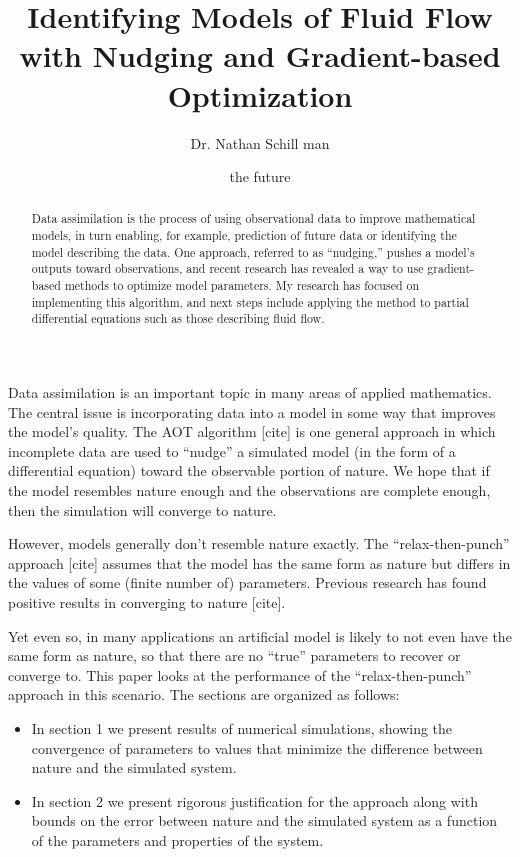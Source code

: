 \documentclass[12pt]{article}
\title{Identifying Models of Fluid Flow with Nudging and Gradient-based Optimization}
\author{Dr. Nathan Schill man}
\date{the future}
\begin{document}
\maketitle

\begin{abstract}
    Data assimilation is the process of using observational data to improve mathematical models, in turn enabling, for example, prediction of future data or identifying the model describing the data.
    One approach, referred to as ``nudging,'' pushes a model's outputs toward observations, and recent research has revealed a way to use gradient-based methods to optimize model parameters.
    My research has focused on implementing this algorithm, and next steps include applying the method to partial differential equations such as those describing fluid flow.
\end{abstract}

Data assimilation is an important topic in many areas of applied mathematics.
The central issue is incorporating data into a model in some way that improves the model's quality.
The AOT algorithm [cite] is one general approach in which incomplete data are used to ``nudge'' a simulated model (in the form of a differential equation) toward the observable portion of nature.
We hope that if the model resembles nature enough and the observations are complete enough, then the simulation will converge to nature.

However, models generally don't resemble nature exactly.
The ``relax-then-punch'' approach [cite] assumes that the model has the same form as nature but differs in the values of some (finite number of) parameters.
Previous research has found positive results in converging to nature [cite].

Yet even so, in many applications an artificial model is likely to not even have the same form as nature, so that there are no ``true'' parameters to recover or converge to.
This paper looks at the performance of the ``relax-then-punch'' approach in this scenario.
The sections are organized as follows:
\begin{itemize}
    \item In section 1 we present results of numerical simulations, showing the convergence of parameters to values that minimize the difference between nature and the simulated system.
    \item In section 2 we present rigorous justification for the approach along with bounds on the error between nature and the simulated system as a function of the parameters and properties of the system.
\end{itemize}
\end{document}
